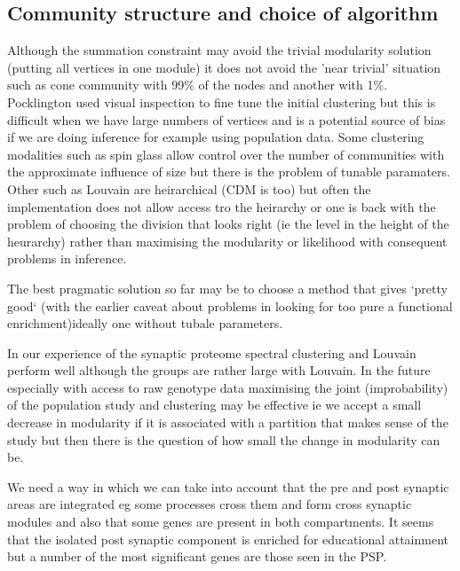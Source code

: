 \subsection{Community structure and choice of algorithm}

Although the summation constraint  may avoid the trivial modularity solution (putting all vertices in one module) it does not avoid the 'near trivial' situation such as cone community with 99\% of the nodes and another with 1\%. Pocklington used visual inspection to fine tune the initial clustering but this is difficult when we have large numbers of vertices and is a potential source of bias if we are doing inference for example using population data. Some clustering modalities such as spin glass allow control over the number of communities with the approximate influence of size but there is the problem of tunable paramaters. Other such as Louvain are heirarchical (CDM is too) but often the implementation does not allow access tro the heirarchy or one is back with the problem of choosing the division that looks right (ie the level in the height of the heurarchy) rather than maximising the modularity or likelihood with consequent problems in inference. 

The best pragmatic solution so far may be to choose a method that gives `pretty good` (with the earlier caveat about problems in looking for too pure a functional enrichment)ideally one without tubale parameters. 

In our experience of the synaptic proteome spectral clustering and Louvain perform well although the groups are rather large with Louvain. In the future especially with access to raw genotype data maximising the joint (improbability) of the population study and clustering may be effective ie we accept a small decrease in modularity if it is associated with a partition that makes sense of the study but then there is the question of how small the change in modularity can be. 



We need a way in which we can take into account that the pre and post synaptic areas are integrated eg some processes cross them and form cross synaptic modules and also that some genes are present in both compartments. It seems that the isolated post synaptic component is enriched for educational attainment but a number of the most significant genes are those seen in the PSP.








